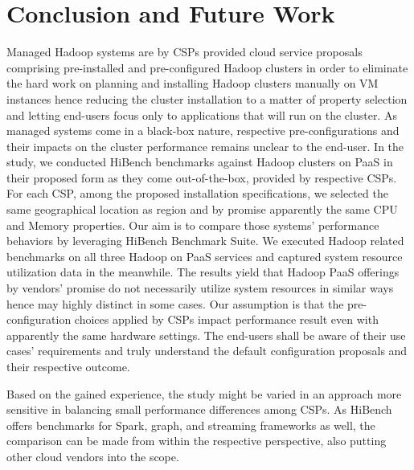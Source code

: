 \documentclass[review]{elsarticle}
\begin{document}
\section{Conclusion and Future Work}
Managed Hadoop systems are by CSPs provided cloud service proposals comprising pre-installed and pre-configured Hadoop clusters in order to eliminate the hard work on planning and installing Hadoop clusters manually on VM instances hence reducing the cluster installation to a matter of property selection and letting end-users focus only to applications that will run on the cluster. As managed systems come in a black-box nature, respective pre-configurations and their impacts on the cluster performance remains unclear to the end-user. In the study, we conducted HiBench benchmarks against Hadoop clusters on PaaS in their proposed form as they come out-of-the-box, provided by respective CSPs. For each CSP, among the proposed installation specifications, we selected the same geographical location as region and by promise apparently the same CPU and Memory properties. Our aim is to compare those systems' performance behaviors by leveraging HiBench Benchmark Suite. We executed Hadoop related benchmarks on all three Hadoop on PaaS services and captured system resource utilization data in the meanwhile. The results yield that Hadoop PaaS offerings by vendors' promise do not necessarily utilize system resources in similar ways hence may highly distinct in some cases. Our assumption is that the pre-configuration choices applied by CSPs impact performance result even with apparently the same hardware settings. The end-users shall be aware of their use cases' requirements and truly understand the default configuration proposals and their respective outcome.

Based on the gained experience, the study might be varied in an approach more sensitive in balancing small performance differences among CSPs. As HiBench offers benchmarks for Spark, graph, and streaming frameworks as well, the comparison can be made from within the respective perspective, also putting other cloud vendors into the scope.


\end{document}
